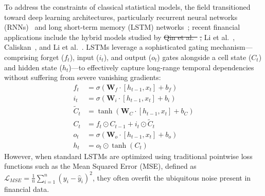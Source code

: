 \documentclass[11pt,a4paper]{article}
\makeatletter
\providecommand{\DIFdeltex}[1]{{\protect\color{red}\sout{#1}}} %
\providecommand{\DIFdelbegin}{} %
\providecommand{\DIFdelend}{} %
\providecommand{\DIFdel}[1]{\texorpdfstring{\DIFdeltex{#1}}{}} %
\providecommand{\DIFscaledelfig}{0.5}
\newlength{\DIFdelgraphicswidth} %
\newlength{\DIFdelgraphicsheight} %
\providecommand{\DIFdelincludegraphics}[2][]{%
\sbox{\DIFdelgraphicsbox}{\DIFOincludegraphics[#1]{#2}}%
\settoboxwidth{\DIFdelgraphicswidth}{\DIFdelgraphicsbox} %
\settoboxtotalheight{\DIFdelgraphicsheight}{\DIFdelgraphicsbox} %
\scalebox{\DIFscaledelfig}{%
\parbox[b]{\DIFdelgraphicswidth}{\usebox{\DIFdelgraphicsbox}\\[-\baselineskip] \rule{\DIFdelgraphicswidth}{0em}}\llap{\resizebox{\DIFdelgraphicswidth}{\DIFdelgraphicsheight}{%
\setlength{\unitlength}{\DIFdelgraphicswidth}%
\begin{picture}(1,1)%
\thicklines\linethickness{2pt} %
{\color[rgb]{1,0,0}\put(0,0){\framebox(1,1){}}}%
{\color[rgb]{1,0,0}\put(0,0){\line( 1,1){1}}}%
{\color[rgb]{1,0,0}\put(0,1){\line(1,-1){1}}}%
\end{picture}%
}\hspace*{3pt}}} %
} %
\DeclareRobustCommand{\DIFdelbegin}{\DIFOdelbegin \let\includegraphics\DIFdelincludegraphics} %
\DeclareRobustCommand{\DIFdelend}{\DIFOaddend \let\includegraphics\DIFOincludegraphics} %
\let\sout@orig\sout %
\renewcommand{\sout}[1]{\ifmmode\text{\sout@orig{\ensuremath{#1}}}\else\sout@orig{#1}\fi} %
\makeatother
\begin{document}
To address the constraints of classical statistical models, the field transitioned toward deep learning architectures, particularly recurrent neural networks (RNNs)~\citep{elman1990finding} and long short-term memory (LSTM) networks~\citep{hochreiter1997lstm}; recent financial applications include the hybrid models studied by \DIFdelbegin \DIFdel{Qin et al.~}%
\DIFdel{, }\DIFdelend Li et al.~\citep{li2025ceemdan}, Caliskan~\citep{caliskan2025}, and Li et al.~\citep{SGP-LSTM1}. LSTMs leverage a sophisticated gating mechanism—comprising forget ($f_t$), input ($i_t$), and output ($o_t$) gates alongside a cell state ($C_t$) and hidden state ($h_t$)—to effectively capture long-range temporal dependencies without suffering from severe vanishing gradients:
\begin{align}
f_t &= \sigma(\mathbf{W}_f \cdot[h_{t-1}, x_t] + b_f) \\
i_t &= \sigma(\mathbf{W}_i \cdot [h_{t-1}, x_t] + b_i) \\
\tilde{C}_t &= \tanh(\mathbf{W}_C \cdot[h_{t-1}, x_t] + b_C) \\
C_t &= f_t \odot C_{t-1} + i_t \odot \tilde{C}_t \\
o_t &= \sigma(\mathbf{W}_o \cdot [h_{t-1}, x_t] + b_o) \\
h_t &= o_t \odot \tanh(C_t)
\end{align}
However, when standard LSTMs are optimized using traditional pointwise loss functions such as the Mean Squared Error (MSE), defined as $\mathcal{L}_{MSE} = \frac{1}{n} \sum_{i=1}^n (y_i - \hat{y}_i)^2$, they often overfit the ubiquitous noise present in financial data.
\end{document}

